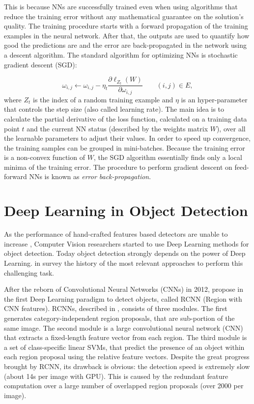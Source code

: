 This is because NNs are successfully trained even when using algorithms that reduce the training error without any mathematical guarantee on the solution's quality. The training procedure starts with a forward propagation of the training examples in the neural network. After that, the outputs are used to quantify how good the predictions are and the error are back-propagated in the network using a descent algorithm. The standard algorithm for optimizing NNs is stochastic gradient descent (SGD):

\begin{equation}
\omega_{i, j} \leftarrow \omega_{i, j} - \eta_t \frac{\partial\ell_{Z_t}(W)}{\partial\omega_{i, j}} \quad \quad (i, j) \in E,
\end{equation}
where $Z_t$ is the index of a random training example and $\eta$ is an hyper-parameter that controls the step size (also called learning rate). The main idea is to calculate the partial derivative of the loss function, calculated on a training data point $t$ and the current NN status (described by the weights matrix $W$), over all the learnable parameters to adjust their values. In order to speed up convergence, the training samples can be grouped in mini-batches. Because the training error is a non-convex function of $W$, the SGD algorithm essentially finds only a local minima of the training error. The procedure to perform gradient descent on feed-forward NNs is known as \textit{error back-propagation}.
 
 \section{Deep Learning in Object Detection}
 As the performance of hand-crafted features based detectors are unable to increase \cite{deeplearningoverview}, Computer Vision researchers started to use Deep Learning methods for object detection. Today object detection strongly depends on the power of Deep Learning. \citeauthor{computervisionsurvey} in \cite{computervisionsurvey} survey the history of the most relevant approaches to perform this challenging task. 
 
 After the reborn of Convolutional Neural Networks (CNNs) in 2012, \citeauthor{rcnn} propose in \cite{rcnn} the first Deep Learning paradigm to detect objects, called RCNN (Region with CNN features). RCNNs, described in \cite{rcnn}, consists of three modules. The first generates category-independent region proposals, that are sub-portion of the same image. The second module is a large convolutional neural network (CNN) that extracts a fixed-length feature
 vector from each region. The third module is a set of class-specific linear SVMs, that predict the presence of an object within each region proposal using the relative feature vectors. Despite the great progress brought by RCNN, its drawback is obvious: the detection speed is extremely slow (about 14s per
 image with GPU). This is caused by the redundant feature computation over a large number of overlapped region proposals (over 2000 per image).
 
